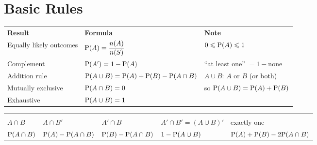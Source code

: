 \clearpage
{}
\section{Basic Rules}
\begin{center}\bba\small
\begin{tabular}{|L{4.4cm}|M{5.5cm}|L{5.3cm}|}\hline
\textbf{Result} & \textbf{Formula} & \textbf{Note}\\\Xhline{2pt}
Equally likely outcomes & $\mathrm{P}(A)=\dfrac{n(A)}{n(S)}$ & $0\leqslant\mathrm{P}(A)\leqslant1$\\\hline
Complement & $\mathrm{P}(A')=1-\mathrm{P}(A)$ & ``at least one'' $=1-\text{none}$\\\hline
Addition rule & $\mathrm{P}(A\cup B)=\mathrm{P}(A)+\mathrm{P}(B)-\mathrm{P}(A\cap B)$ & $A\cup B$: $A$ or $B$ (or both)\\\hline
Mutually exclusive & $\mathrm{P}(A\cap B)=0$ & so $\mathrm{P}(A\cup B)=\mathrm{P}(A)+\mathrm{P}(B)$\\\hline
Exhaustive & $\mathrm{P}(A\cup B)=1$ & \\\hline
\end{tabular}\end{center}
\begin{center}\ba\small
\begin{tabular}{|M{2.5cm}|M{2.5cm}|M{2.5cm}|M{2.5cm}|M{2.5cm}|}\hline
{}&&&&\\
$A\cap B$&$A\cap B'$&$A'\cap B$&$A'\cap B'=(A\cup B)'$&exactly one\\\hline
$\mathrm{P}(A\cap B)$&$\mathrm{P}(A)-\mathrm{P}(A\cap B)$&$\mathrm{P}(B)-\mathrm{P}(A\cap B)$&$1-\mathrm{P}(A\cup B)$&$\mathrm{P}(A)+\mathrm{P}(B)-2\mathrm{P}(A\cap B)$\\\hline
\end{tabular}\end{center}
\par
